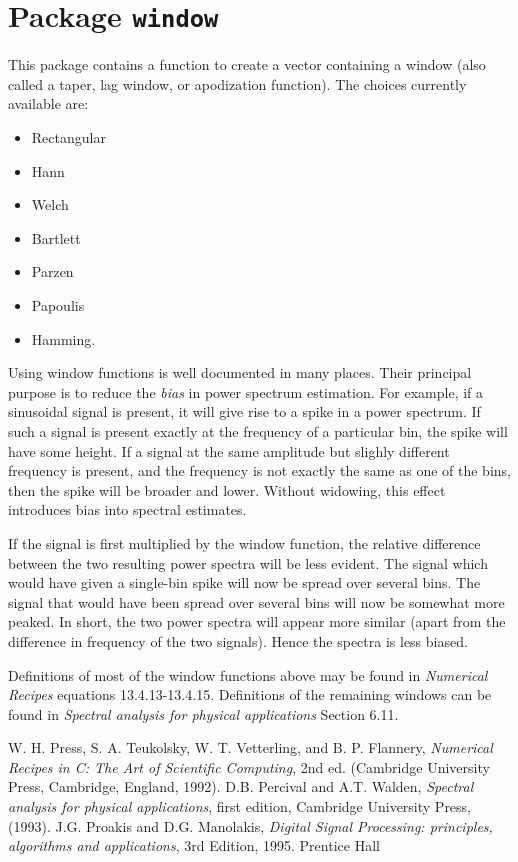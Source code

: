 \chapter{Package \texttt{window}}

This package contains a function to create a vector
containing a window (also called
a taper, lag window, or apodization function).  The choices
currently available are:
\begin{itemize}
\item Rectangular
\item Hann
\item Welch
\item Bartlett
\item Parzen
\item Papoulis
\item Hamming.
\end{itemize}
Using window functions is well documented in many places.  Their
principal purpose is to reduce the {\it bias} in power spectrum
estimation.  For example, if a sinusoidal signal is present, it will
give rise to a spike in a power spectrum.  If such a  signal is present
exactly at the frequency of a particular bin, the spike will have some
height.  If a signal at the same amplitude but slighly different
frequency is present, and the frequency is not exactly the same
as one of the bins, then
the spike will be broader and lower. Without widowing, this effect introduces
bias into spectral estimates.

If the signal is first multiplied by the window function, the
relative difference between the two resulting power spectra will be
less evident.  The signal which would have given a single-bin spike
will now be spread over several bins.  The signal that would have
been spread over several bins will now be somewhat more peaked.
In short, the two power spectra will appear more similar (apart from
the difference in frequency of the two signals).  Hence the spectra
is less biased.

Definitions of most of the window functions above may be found in {\it Numerical Recipes} \cite{numrec} equations 13.4.13-13.4.15.  Definitions
of the remaining windows can be found in {\it Spectral analysis for physical applications} \cite{pw} Section 6.11.


\newpage
\newpage\begin{thebibliography}{0}
W. H. Press, S. A. Teukolsky, W. T. Vetterling, and B. P. Flannery,
  \textit{Numerical Recipes in C: The Art of Scientific Computing}, 2nd ed.
  (Cambridge University Press, Cambridge, England, 1992).
D.B. Percival and A.T. Walden, {\it Spectral analysis for physical applications}, first edition, Cambridge University Press, (1993).
J.G. Proakis and D.G. Manolakis, {\it Digital
Signal Processing: principles, algorithms and applications},
3rd Edition, 1995.
Prentice Hall
\end{thebibliography}
